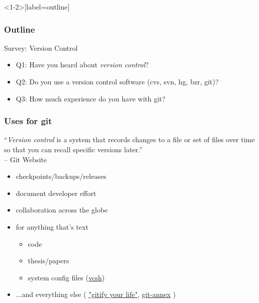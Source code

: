 \documentclass{beamer}
\newcommand{\git}{git\xspace}
\begin{document}

\begin{frame}<1-2>[label=outline]
 \frametitle{Outline}

  
\end{frame}


\begin{frame}{Survey: Version Control}
\begin{itemize}\setlength{\itemsep}{+3mm}
  \item<alert@+> Q1: Have you heard about \emph{version control}?
  \item<alert@+> Q2: Do you use a version control software (cvs, svn, hg, bzr, git)?
  \item<alert@+> Q3: How much experience do you have with \git?
\end{itemize}
\end{frame}


\begin{frame}
 \frametitle{Uses for \git}

\begin{block}{}
``\emph{Version control} is a system that records changes to a file or set of files over time so that you can recall specific versions later.''\\
\hfill-- Git Website
\end{block}

\begin{itemize}
  \item checkpoints/backups/releases
  \item document developer effort
  \item collaboration across the globe
\end{itemize}

\begin{itemize}
  \item for anything that's text
\begin{itemize}
  \item code
  \item thesis/papers
  \item system config files {\footnotesize (\href{https://github.com/RichiH/vcsh}{vcsh})}
\end{itemize}
 \item ...and everything else {\footnotesize(
    \href{http://penta.debconf.org/dc13_schedule/events/1025.en.html}{"gitify your life"}, 
    \href{https://git-annex.branchable.com/}{git-annex}
    )}
\end{itemize}

\end{frame}
\end{document}
